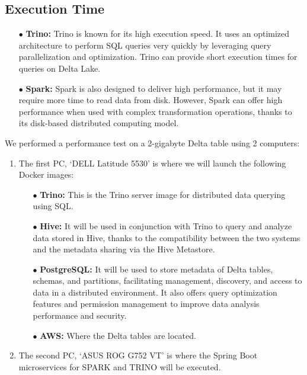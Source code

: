 \subsection{Execution Time}
\begin{enumerate}
\item[$\bullet$] \textbf{Trino:} Trino is known for its high execution speed. It uses an optimized architecture to perform SQL queries very quickly by leveraging query parallelization and optimization. Trino can provide short execution times for queries on Delta Lake.
\item[$\bullet$] \textbf{Spark:} Spark is also designed to deliver high performance, but it may require more time to read data from disk. However, Spark can offer high performance when used with complex transformation operations, thanks to its disk-based distributed computing model.
\end{enumerate}

We performed a performance test on a 2-gigabyte Delta table using 2 computers:
\begin{enumerate}
\item The first PC, `DELL Latitude 5530' is where we will launch the following Docker images:
\begin{enumerate}
\item[$\bullet$] \textbf{Trino:} This is the Trino server image for distributed data querying using SQL.
\item[$\bullet$] \textbf{Hive:} It will be used in conjunction with Trino to query and analyze data stored in Hive, thanks to the compatibility between the two systems and the metadata sharing via the Hive Metastore.
\item[$\bullet$] \textbf{PostgreSQL:} It will be used to store metadata of Delta tables, schemas, and partitions, facilitating management, discovery, and access to data in a distributed environment. It also offers query optimization features and permission management to improve data analysis performance and security.
\item[$\bullet$] \textbf{AWS:} Where the Delta tables are located.
\end{enumerate}
\item The second PC, `ASUS ROG G752 VT' is where the Spring Boot microservices for SPARK and TRINO will be executed.
\end{enumerate}

